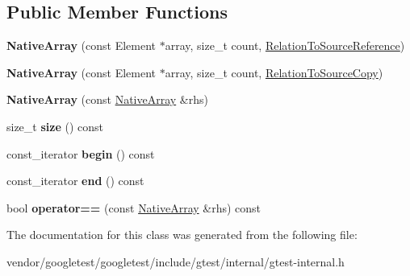 \subsection*{Public Member Functions}
\begin{DoxyCompactItemize}
\item 
\mbox{\label{classtesting_1_1internal_1_1_native_array_a52b3689c62532703d11e9d82939a7141}} 
{\bfseries Native\+Array} (const Element $\ast$array, size\+\_\+t count, \hyperlink{structtesting_1_1internal_1_1_relation_to_source_reference}{Relation\+To\+Source\+Reference})
\item 
\mbox{\label{classtesting_1_1internal_1_1_native_array_ac184ee5741af5be3402213819c834405}} 
{\bfseries Native\+Array} (const Element $\ast$array, size\+\_\+t count, \hyperlink{structtesting_1_1internal_1_1_relation_to_source_copy}{Relation\+To\+Source\+Copy})
\item 
\mbox{\label{classtesting_1_1internal_1_1_native_array_abb346ac3040f5da733f594cc2d5958bc}} 
{\bfseries Native\+Array} (const \hyperlink{classtesting_1_1internal_1_1_native_array}{Native\+Array} \&rhs)
\item 
\mbox{\label{classtesting_1_1internal_1_1_native_array_af96a4a5ca0cdd5d163c47a081f08bd89}} 
size\+\_\+t {\bfseries size} () const
\item 
\mbox{\label{classtesting_1_1internal_1_1_native_array_a3046d93cfa23097e7b7c91f5f982dc78}} 
const\+\_\+iterator {\bfseries begin} () const
\item 
\mbox{\label{classtesting_1_1internal_1_1_native_array_ae1cda748e49c6906421c6183c4d07c5a}} 
const\+\_\+iterator {\bfseries end} () const
\item 
\mbox{\label{classtesting_1_1internal_1_1_native_array_a81b90f5739ed812610e68dc34c9e3850}} 
bool {\bfseries operator==} (const \hyperlink{classtesting_1_1internal_1_1_native_array}{Native\+Array} \&rhs) const
\end{DoxyCompactItemize}


The documentation for this class was generated from the following file\+:\begin{DoxyCompactItemize}
\item 
vendor/googletest/googletest/include/gtest/internal/gtest-\/internal.\+h\end{DoxyCompactItemize}
